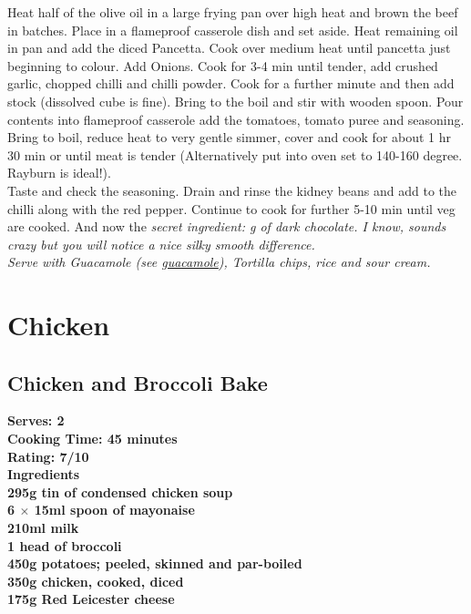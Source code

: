\documentclass[18pt, oneside]{book}
\begin{document}
Heat half of the olive oil in a large frying pan over high heat and brown the beef in batches. Place in a flameproof casserole dish and set aside. Heat remaining oil in pan and add the diced Pancetta. Cook over medium heat until pancetta just beginning to colour. Add Onions. Cook for 3-4 min until tender, add crushed garlic, chopped chilli and chilli powder. Cook for a further minute and then add stock (dissolved cube is fine). Bring to the boil and stir with wooden spoon. Pour contents into flameproof casserole add the tomatoes, tomato puree and seasoning. Bring to boil, reduce heat to very gentle simmer, cover and cook for about 1 hr 30 min or until meat is tender (Alternatively put into oven set to 140-160 degree. Rayburn is ideal!). \\

Taste and check the seasoning. Drain and rinse the kidney beans and add to the chilli along with the red pepper. Continue to cook for further 5-10 min until veg are cooked. And now the \it{secret ingredient}:  g of dark chocolate. I know, sounds crazy but you will notice a nice silky smooth difference. \\

Serve with Guacamole (see \hyperref[guacamole]{guacamole}), Tortilla chips, rice and sour cream.

\chapter{Chicken}

\section{Chicken and Broccoli Bake}

\bf{Serves: 2} \\
\bf{Cooking Time: 45 minutes} \\
\bf{Rating: 7/10} \\

\bf{Ingredients} \normalfont \\
295g tin of condensed chicken soup \\
6 $\times$ 15ml spoon of mayonaise \\
210ml milk \\
1 head of broccoli \\
450g potatoes; peeled, skinned and par-boiled \\
350g chicken, cooked, diced \\
175g Red Leicester cheese \\
\end{document}
